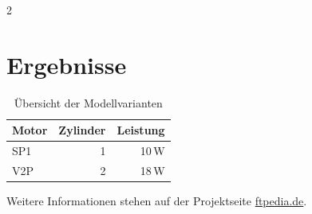 \documentclass{ftpedia}
\begin{document}
\begin{multicols}{2}
\section{Ergebnisse}

\begin{table}[H]
  \centering
  \begin{tabular}{lrr}
    \hline
    Motor & Zylinder & Leistung \\
    \hline
    SP1  & 1 & 10\,W \\
    V2P  & 2 & 18\,W \\
    \hline
  \end{tabular}
  \caption{Übersicht der Modellvarianten}
\end{table}

Weitere Informationen stehen auf der Projektseite \url{ftpedia.de}.

\end{multicols}
\end{document}
